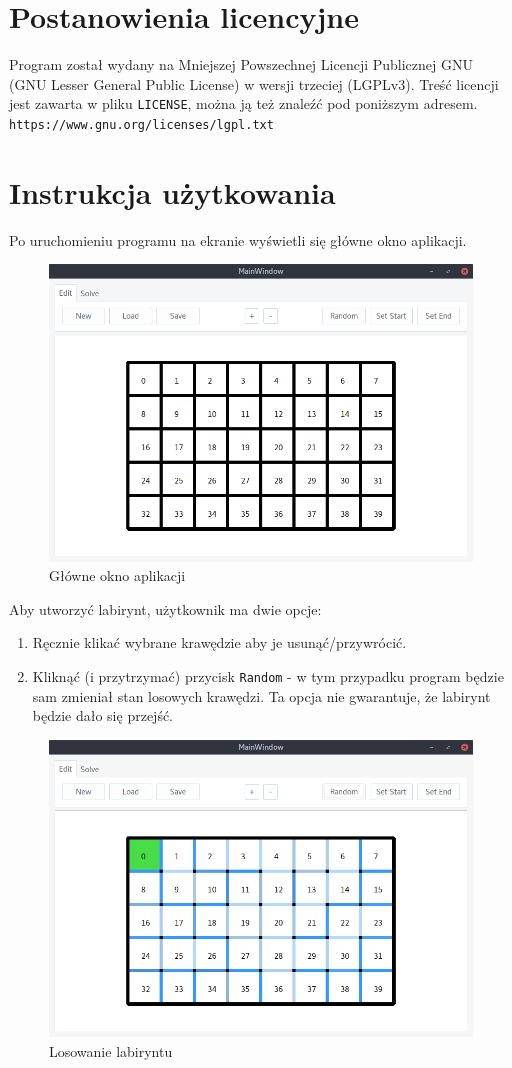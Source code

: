 \documentclass[12pt,a4paper]{article}
\begin{document}
	\medskip
	\section{Postanowienia licencyjne}	
	Program został wydany na Mniejszej Powszechnej Licencji Publicznej GNU 
	(GNU Lesser General Public License) w wersji trzeciej (LGPLv3). Treść
	licencji jest zawarta w pliku \texttt{LICENSE}, można ją też znaleźć
	pod poniższym adresem.\\
	\texttt{https://www.gnu.org/licenses/lgpl.txt}
	
	\pagebreak

	\section{Instrukcja użytkowania}	
	Po uruchomieniu programu na ekranie wyświetli się główne okno
	aplikacji.	
	\begin{figure}[H]
		\centering
		\includegraphics[width=0.8\linewidth]{obrazki/1.png}
		\caption{Główne okno aplikacji}
	\end{figure}
	
	Aby utworzyć labirynt, użytkownik ma dwie opcje:
	\begin{enumerate}
		\item Ręcznie klikać wybrane krawędzie aby je usunąć/przywrócić.
		\item Kliknąć (i przytrzymać) przycisk \texttt{Random} - w tym
			przypadku program będzie sam zmieniał stan losowych
			krawędzi. Ta opcja nie gwarantuje, że labirynt będzie dało
			się przejść.
	\end{enumerate}
	
	\begin{figure}[H]
		\centering
		\includegraphics[width=0.8\linewidth]{obrazki/2.png}
		\caption{Losowanie labiryntu}
	\end{figure}
	
\end{document}
